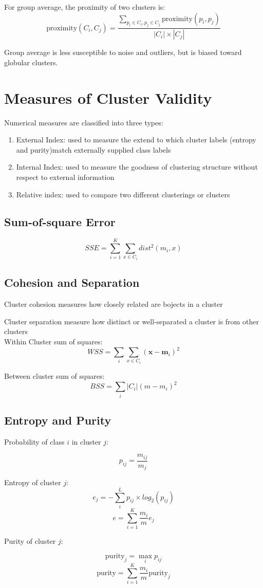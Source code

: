 \begin{multicols}{2}
\noindent For group average, the proximity of two clusters is:
$$\text{proximity}(C_i, C_j) = \frac{\sum_{p_i \in C_i, p_j \in C_j} \text{proximity}(p_i,p_j)}{|C_i|\times|C_j|}$$

\noindent Group average is less susceptible to noise and outliers, but is biased toward globular clusters. 

\section{Measures of Cluster Validity}

\noindent Numerical measures are classified into three types:

\begin{enumerate}
    \item External Index: used to measure the extend to which cluster labels (entropy and purity)match externally supplied class labels
    \item Internal Index: used to measure the goodness of clustering structure without respect to external information
    \item Relative index: used to compare two different clusterings or clusters
\end{enumerate}

\subsection{Sum-of-square Error}

$$SSE=\sum_{i=1}^K \sum_{x \in C_i} dist^2 (m_i,x)$$

\subsection{Cohesion and Separation}

\noindent Cluster cohesion measures how closely related are bojects in a cluster

\noindent Cluster separation measure how distinct or well-separated a cluster is from other clusters \\

\noindent Within Cluster sum of squares:
$$WSS=\sum_i \sum_{x \in C_i} (\mathbf{x}-\mathbf{m}_i)^2$$

\noindent Between cluster sum of squares:
$$BSS=\sum_i |C_i| (m-m_i)^2$$

\subsection{Entropy and Purity}

\noindent Probability of class $i$ in cluster $j$:

$$p_{ij} = \frac{m_{ij}}{m_j}$$

\noindent Entropy of cluster $j$:
$$e_j = - \sum_{i}^{L} p_{ij} \times log_2 (p_{ij})$$
$$e = \sum_{i=1}^K \frac{m_i}{m} e_j$$

\noindent Purity of cluster $j$:

$$\text{purity}_j= \!\max_i p_{ij}$$
$$\text{purity} = \sum_{i=1}^K \frac{m_i}{m}\text{purity}_j$$

\end{multicols}

